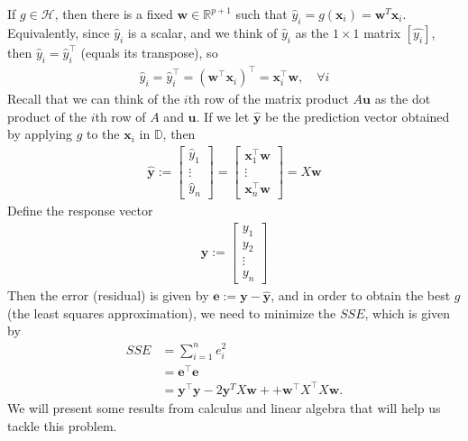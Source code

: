 \documentclass[12pt, a4paper]{article}
\theoremstyle{definition}
\begin{document}
	If $g\in\mathcal{H}$, then there is a fixed $\mathbf{w}\in\mathbb{R}^{p+1}$ such
	that $\hat{y}_i=g(\mathbf{x}_i)=\mathbf{w}^T\mathbf{x}_i$. Equivalently, since
	$\hat{y}_i$ is a scalar, and we think of $\hat{y}_i$ as the $1\times 1$ matrix $[\hat{y_i}]$, then
	$\hat{y}_i=\hat{y}_i^\top$ (equals its transpose), so
	\begin{align*}
		\hat{y}_i=\hat{y}_i^\top = (\mathbf{w}^\top \mathbf{x}_i)^\top = \mathbf{x}_i^\top \mathbf{w},\quad
		\forall i
	\end{align*}
	Recall that we can think of the $i$th row of the matrix product $A\mathbf{u}$ as the
	dot product of the $i$th row of $A$ and $\mathbf{u}$. If we let $\hat{\mathbf{y}}$ be
	the prediction vector obtained by applying $g$ to the $\mathbf{x}_i$ in $\mathbb{D}$, then
	\begin{align*}
		\hat{\mathbf{y}} := \begin{bmatrix}
			\hat{y}_1\\
			\vdots\\
			\hat{y}_n
		\end{bmatrix}
		=
		\begin{bmatrix}
			\mathbf{x}_1^\top \mathbf{w}\\
			\vdots\\
			\mathbf{x}_n^\top \mathbf{w}
		\end{bmatrix}
		=X\mathbf{w}
	\end{align*}
	Define the response vector
	\begin{align*}
	\mathbf{y}:=\begin{bmatrix}
		y_1\\
		y_2\\
		\vdots\\
		y_n
	\end{bmatrix}
	\end{align*}
	Then the error (residual) is given by $\mathbf{e}:=\mathbf{y}-\hat{\mathbf{y}}$,
	and in order to obtain the best $g$ (the least squares approximation), we need
	to minimize the $SSE$, which is given by
	\begin{align}
		SSE &= \sum_{i=1}^{n}e_i^2\nonumber\\
		&=\mathbf{e}^\top \mathbf{e}\nonumber\\
		&=\mathbf{y}^\top\mathbf{y} - 2\mathbf{y}^TX\mathbf{w}+
		+\mathbf{w}^\top X^\top X \mathbf{w}.
		\label{eqn:sse-objective}
	\end{align}
	We will present some results from calculus and linear algebra that will help us tackle
	this problem.
\end{document}
